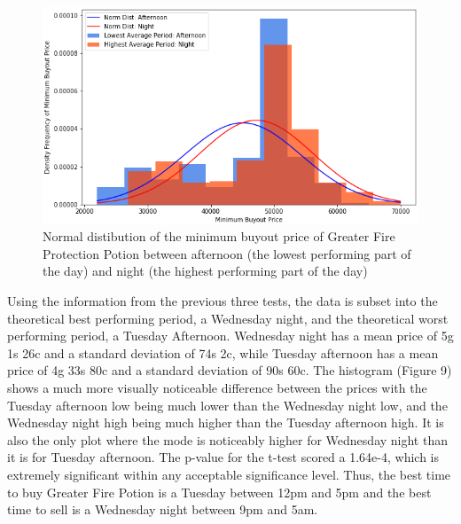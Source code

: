 \documentclass[sigconf]{acmart}
\begin{document}
\begin{figure}[h]
\centering
\includegraphics[width=\linewidth]{pod_hist}
\caption{Normal distibution of the minimum buyout price of Greater Fire Protection Potion between afternoon (the lowest performing part of the day) and night (the highest performing part of the day)}
\end{figure}

Using the information from the previous three tests, the data is subset into the theoretical best performing period, a Wednesday night, and the theoretical worst performing period, a Tuesday Afternoon. Wednesday night has a mean price of 5g 1s 26c and a standard deviation of 74s 2c, while Tuesday afternoon has a mean price of 4g 33s 80c and a standard deviation of 90s 60c. The histogram (Figure 9) shows a much more visually noticeable difference between the prices with the Tuesday afternoon low being much lower than the Wednesday night low, and the Wednesday night high being much higher than the Tuesday afternoon high. It is also the only plot where the mode is noticeably higher for Wednesday night than it is for Tuesday afternoon. The p-value for the t-test scored a 1.64e-4, which is extremely significant within any acceptable significance level. Thus, the best time to buy Greater Fire Potion is a Tuesday between 12pm and 5pm and the best time to sell is a Wednesday night between 9pm and 5am.
\end{document}
